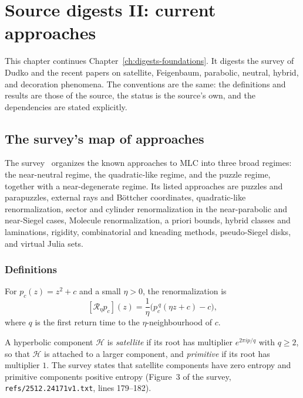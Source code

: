 \chapter{Source digests II: current approaches}
\label{ch:digests-modern}

This chapter continues Chapter~\ref{ch:digests-foundations}.  It digests the
survey of Dudko and the recent papers on satellite, Feigenbaum, parabolic,
neutral, hybrid, and decoration phenomena.  The conventions are the same: the
definitions and results are those of the source, the status is the source's own,
and the dependencies are stated explicitly.

\section{The survey's map of approaches}
\label{sec:digest-survey}

The survey~\cite{DudkoMLC} organizes the known approaches to MLC into three
broad regimes: the near-neutral regime, the quadratic-like regime, and the
puzzle regime, together with a near-degenerate regime.  Its listed approaches are
puzzles and parapuzzles, external rays and Böttcher coordinates, quadratic-like
renormalization, sector and cylinder renormalization in the near-parabolic and
near-Siegel cases, Molecule renormalization, a priori bounds, hybrid classes and
laminations, rigidity, combinatorial and kneading methods, pseudo-Siegel disks,
and virtual Julia sets.

\subsection*{Definitions}

\begin{definition}
\label{def:survey-renorm}
For $p_c(z)=z^2+c$ and a small $\eta>0$, the renormalization is
\[
 [\mathcal R_\eta p_c](z)=\frac1\eta\bigl(p_c^{\,q}(\eta z+c)-c\bigr),
\]
where $q$ is the first return time to the $\eta$-neighbourhood of $c$.
\end{definition}

\begin{definition}
\label{def:survey-satellite}
A hyperbolic component $\mathcal H$ is \emph{satellite} if its root has multiplier $e^{2\pi i p/q}$ with $q\ge2$,
so that $\mathcal H$ is attached to a larger component, and \emph{primitive} if its root has multiplier $1$.  The survey
states that satellite components have zero entropy and primitive components positive entropy (Figure~3 of the survey,
\texttt{refs/2512.24171v1.txt}, lines 179--182).
\end{definition}

